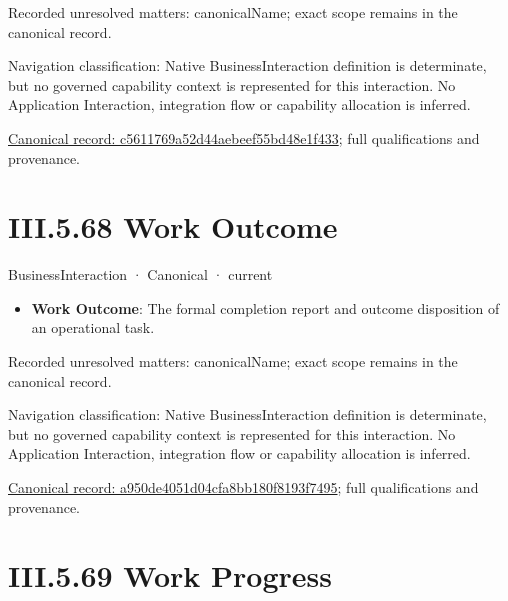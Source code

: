 {\small Recorded unresolved matters: canonicalName; exact scope remains in the canonical record.}\par
{\small Navigation classification: Native BusinessInteraction definition is determinate, but no governed capability context is represented for this interaction. No Application Interaction, integration flow or capability allocation is inferred.}\par
{\footnotesize \href{../../../../continuum/business/business-interaction/c5611769a52d44aebeef55bd48e1f433.md}{Canonical record: c5611769a52d44aebeef55bd48e1f433}; full qualifications and provenance.}\par
\section*{III.5.68 Work Outcome}
\label{navigation:III.5.68}

\label{element:a950de4051d04cfa8bb180f8193f7495}
{\small BusinessInteraction · Canonical · current}\par

\begin{itemize}


\item \textbf{Work Outcome}: The formal completion report and outcome disposition of an operational task.

\end{itemize}

{\small Recorded unresolved matters: canonicalName; exact scope remains in the canonical record.}\par
{\small Navigation classification: Native BusinessInteraction definition is determinate, but no governed capability context is represented for this interaction. No Application Interaction, integration flow or capability allocation is inferred.}\par
{\footnotesize \href{../../../../continuum/business/business-interaction/a950de4051d04cfa8bb180f8193f7495.md}{Canonical record: a950de4051d04cfa8bb180f8193f7495}; full qualifications and provenance.}\par
\section*{III.5.69 Work Progress}
\label{navigation:III.5.69}

